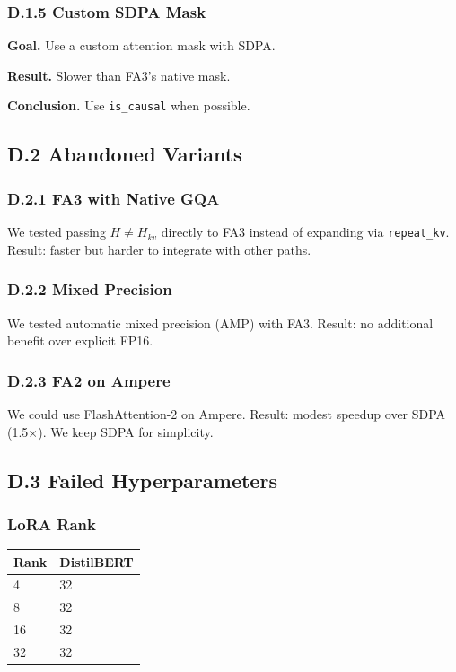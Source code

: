 \subsubsection{D.1.5 Custom SDPA Mask}

\textbf{Goal.} Use a custom attention mask with SDPA.

\textbf{Result.} Slower than FA3's native mask.

\textbf{Conclusion.} Use \texttt{is\_causal} when possible.

\subsection{D.2 Abandoned Variants}

\subsubsection{D.2.1 FA3 with Native GQA}

We tested passing $H \neq H_{kv}$ directly to FA3 instead of expanding via 
\texttt{repeat\_kv}. Result: faster but harder to integrate with other paths.

\subsubsection{D.2.2 Mixed Precision}

We tested automatic mixed precision (AMP) with FA3. Result: no additional 
benefit over explicit FP16.

\subsubsection{D.2.3 FA2 on Ampere}

We could use FlashAttention-2 on Ampere. Result: modest speedup over SDPA 
(1.5$\times$). We keep SDPA for simplicity.

\subsection{D.3 Failed Hyperparameters}

\subsubsection{LoRA Rank}

\begin{table}[H]
\centering
\small
\begin{tabular}{ll}
\toprule
\textbf{Rank} & \textbf{DistilBERT} \\
\midrule
4 & 32 \\
8 & 32 \\
16 & 32 \\
32 & 32 \\
\bottomrule
\end{tabular}
\end{table}

